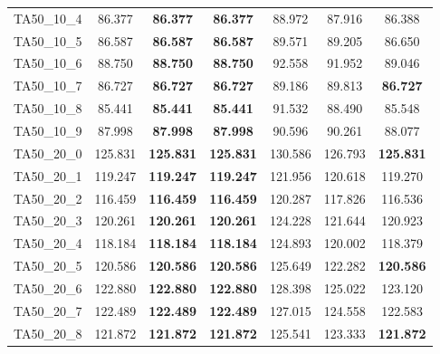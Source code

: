 \begin{tabular}{cc|cc|ccc}
TA50\_10\_4        & 86.377           & {\bf 86.377}     & {\bf 86.377}     & 88.972           & 87.916           & 86.388          \\ 
TA50\_10\_5        & 86.587           & {\bf 86.587}     & {\bf 86.587}     & 89.571           & 89.205           & 86.650          \\ 
TA50\_10\_6        & 88.750           & {\bf 88.750}     & {\bf 88.750}     & 92.558           & 91.952           & 89.046          \\ 
TA50\_10\_7        & 86.727           & {\bf 86.727}     & {\bf 86.727}     & 89.186           & 89.813           & {\bf 86.727}    \\ 
TA50\_10\_8        & 85.441           & {\bf 85.441}     & {\bf 85.441}     & 91.532           & 88.490           & 85.548          \\ 
TA50\_10\_9        & 87.998           & {\bf 87.998}     & {\bf 87.998}     & 90.596           & 90.261           & 88.077          \\ 
TA50\_20\_0        & 125.831          & {\bf 125.831}    & {\bf 125.831}    & 130.586          & 126.793          & {\bf 125.831}   \\ 
TA50\_20\_1        & 119.247          & {\bf 119.247}    & {\bf 119.247}    & 121.956          & 120.618          & 119.270         \\ 
TA50\_20\_2        & 116.459          & {\bf 116.459}    & {\bf 116.459}    & 120.287          & 117.826          & 116.536         \\ 
TA50\_20\_3        & 120.261          & {\bf 120.261}    & {\bf 120.261}    & 124.228          & 121.644          & 120.923         \\ 
TA50\_20\_4        & 118.184          & {\bf 118.184}    & {\bf 118.184}    & 124.893          & 120.002          & 118.379         \\ 
TA50\_20\_5        & 120.586          & {\bf 120.586}    & {\bf 120.586}    & 125.649          & 122.282          & {\bf 120.586}   \\ 
TA50\_20\_6        & 122.880          & {\bf 122.880}    & {\bf 122.880}    & 128.398          & 125.022          & 123.120         \\ 
TA50\_20\_7        & 122.489          & {\bf 122.489}    & {\bf 122.489}    & 127.015          & 124.558          & 122.583         \\ 
TA50\_20\_8        & 121.872          & {\bf 121.872}    & {\bf 121.872}    & 125.541          & 123.333          & {\bf 121.872}   \\ 

\end{tabular}

